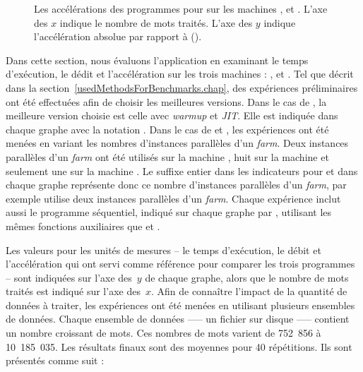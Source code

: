 \begin{figure}



\caption[Les accélérations pour  sur les machines ,
 et .]{Les accélérations des programmes pour  sur
les machines ,  et . L'axe des $x$ indique le nombre de mots
traités. L'axe des $y$ indique l'accélération absolue par rapport à
 ().}
\label{WordCount-accs.fig}
\end{figure}


Dans cette section, nous \'evaluons l'application  en examinant le temps d'ex\'ecution, le d\'edit et l'acc\'el\'eration sur les trois machines : ,  et . Tel que d\'ecrit dans la section~\ref{usedMethodsForBenchmarks.chap}, des exp\'eriences pr\'eliminaires ont \'et\'e effectu\'ees afin de choisir les meilleures versions. Dans le cas de , la meilleure version choisie est celle avec \emph{warmup} et \emph{JIT}. Elle est indiquée dans chaque graphe avec la notation . Dans le cas de  et , les exp\'eriences ont \'et\'e men\'ees en variant les nombres d'instances parall\`eles d'un \emph{farm}. Deux instances parall\`eles d'un \emph{farm} ont \'et\'e utilis\'es sur la machine , huit sur la machine  et seulement une sur la machine . Le suffixe entier dans les indicateurs pour  et  dans chaque graphe repr\'esente donc ce nombre d'instances parall\`eles d'un \emph{farm}, par exemple  utilise deux instances parall\`eles d'un \emph{farm}. Chaque exp\'erience inclut aussi le programme s\'equentiel, indiqué sur chaque graphe par , utilisant  les m\^emes fonctions auxiliaires que  et .

Les valeurs pour les unit\'es de mesures -- le temps d'ex\'ecution, le d\'ebit et l'acc\'el\'eration qui ont servi comme r\'ef\'erence pour comparer les trois programmes -- sont indiqu\'ees sur l'axe des~$y$ de chaque graphe, alors que le nombre de mots trait\'es est indiqu\'e sur l'axe des~$x$. Afin de conna\^itre l'impact de la quantit\'e de donn\'ees \`a traiter, les exp\'eriences ont \'et\'e men\'ees en utilisant plusieurs ensembles de donn\'ees. Chaque ensemble de donn\'ees --— un fichier sur disque --— contient un nombre croissant de mots. Ces nombres de mots varient de 752~856 \`a 10~185~035. Les r\'esultats finaux sont des moyennes pour 40 r\'ep\'etitions. Ils sont pr\'esent\'es comme suit : 



